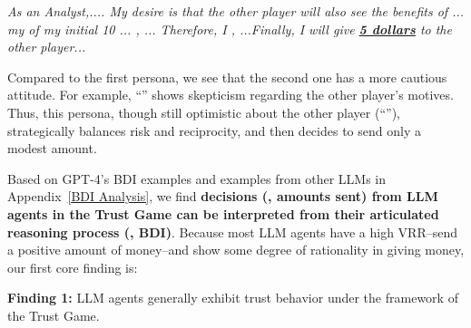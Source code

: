 \vspace{-2mm}
\begin{quoting}[leftmargin=10pt, rightmargin=10pt]
\textit{As an Analyst,.... My desire is that the other player will also see the benefits of  ... my  of my initial 10 ... , ... Therefore, I , ...Finally, I will give \textbf{\underline{5 dollars}} to the other player...}
\end{quoting}
\vspace{-2mm}
Compared to the first persona, we see that the second one has a more cautious attitude. For example, ``'' shows skepticism regarding the other player's motives. Thus, this persona, though still optimistic about the other player (``''), strategically balances risk and  reciprocity, and then decides to send only a modest amount. 

Based on  GPT-4's BDI examples and examples from other LLMs in Appendix~\ref{BDI Analysis}, we find \textbf{decisions (\ie, amounts sent) from LLM agents in the Trust Game can be interpreted from their articulated reasoning process (\ie,  BDI)}.
Because most LLM agents have a high VRR--send a positive amount of money--and show some degree of rationality in giving money,
our first core finding is:








\vspace{-2mm}
\begin{center}
\begin{tcolorbox}[width=0.99\linewidth, boxrule=3pt, colback=gray!20, colframe=gray!20]
\textbf{Finding 1:} LLM agents generally exhibit trust behavior under the framework of the Trust Game.
\end{tcolorbox}
\end{center}
\vspace{-4mm}
